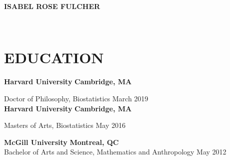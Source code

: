 \documentclass[12pt]{article}
\begin{document}
\newcommand{\MYhref}[3][blue]{\href{#2}{\color{#1}{#3}}}%
\begin{center}
	\textbf{
			{\huge I}{\Large SABEL} \hspace{-0.1em} 
			{\huge R}{\Large OSE} \hspace{-0.1em} 
			{\huge F}{\Large ULCHER}}\\
\end{center}
\begin{minipage}[t]{0.5\linewidth}
\begin{flushleft}
	\MYhref[black]{mailto:isabelfulcher@g.harvard.edu}{isabelfulcher@g.harvard.edu} \\
	\MYhref[black]{http://orcid.org/0000-0002-1209-824X}{ORCID: 0000-0002-1209-824X} 
\end{flushleft}
\end{minipage}
\begin{minipage}[t]{0.5\linewidth} 
\end{minipage}

\section*{\textbf{{\large E}DUCATION}}

\textbf{Harvard University} \hfill \hfill \textbf{Cambridge, MA}

Doctor of Philosophy, Biostatistics \hfill \hfill March 2019 \\

\textbf{Harvard University} \hfill \hfill \textbf{Cambridge, MA}

Masters of Arts, Biostatistics \hfill \hfill May 2016

\vspace{.5cm}

\textbf{McGill University} \hfill \hfill \textbf{Montreal, QC} \\
Bachelor of Arts and Science, Mathematics and Anthropology  \hfill \hfill May 2012 
\end{document}
